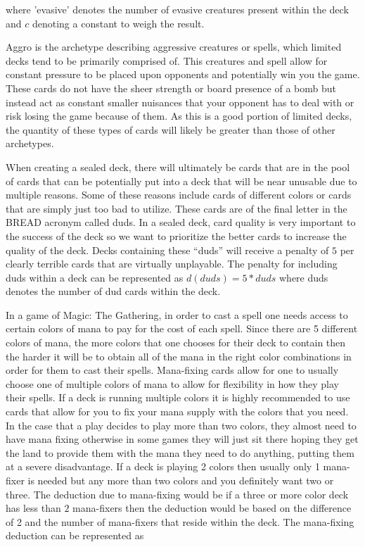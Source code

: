 \documentclass[12pt, letterpaper]{article}
\begin{document}
where 'evasive' denotes the number of evasive creatures present within the deck
and $ c $ denoting a constant to weigh the result.

Aggro is the archetype describing aggressive creatures or spells,
which limited decks tend to be primarily comprised of.
This creatures and spell allow for constant pressure to be placed upon opponents and potentially win you the game.
These cards do not have the sheer strength or board presence of a bomb
but instead act as constant smaller nuisances that your opponent
has to deal with or risk losing the game because of them.
As this is a good portion of limited decks,
the quantity of these types of cards will likely be greater than those of other archetypes.

When creating a sealed deck,
there will ultimately be cards that are in the pool of cards
that can be potentially put into a deck that will be near unusable due to multiple reasons.
Some of these reasons include cards of different colors or
cards that are simply just too bad to utilize.
These cards are of the final letter in the BREAD acronym called duds.
In a sealed deck,
card quality is very important to the success of the deck
so we want to prioritize the better cards to increase the quality of the deck.
Decks containing these “duds” will receive a penalty of $5$ per clearly terrible cards
that are virtually unplayable.
The penalty for including duds within a deck can be represented as $ d(duds) = 5 * duds $
where duds denotes the number of dud cards within the deck.

In a game of Magic: The Gathering,
in order to cast a spell one needs access to certain colors of mana to pay for the cost of each spell.
Since there are 5 different colors of mana,
the more colors that one chooses for their deck to contain
then the harder it will be to obtain all of the mana in the right color combinations
in order for them to cast their spells.
Mana-fixing cards allow for one to usually choose one of multiple colors of mana
to allow for flexibility in how they play their spells.
If a deck is running multiple colors
it is highly recommended to use cards that allow for you to fix your
mana supply with the colors that you need.
In the case that a play decides to play more than two colors,
they almost need to have mana fixing
otherwise in some games they will just sit there hoping
they get the land to provide them with the
mana they need to do anything, putting them at a severe disadvantage.
If a deck is playing 2 colors then usually only 1
mana-fixer is needed but any more than two colors and you definitely want two or three.
The deduction due to mana-fixing would be if a three or more color deck
has less than $ 2 $ mana-fixers then the deduction would be based on the difference of
2 and the number of mana-fixers that reside within the deck.
The mana-fixing deduction can be represented as
\end{document}
